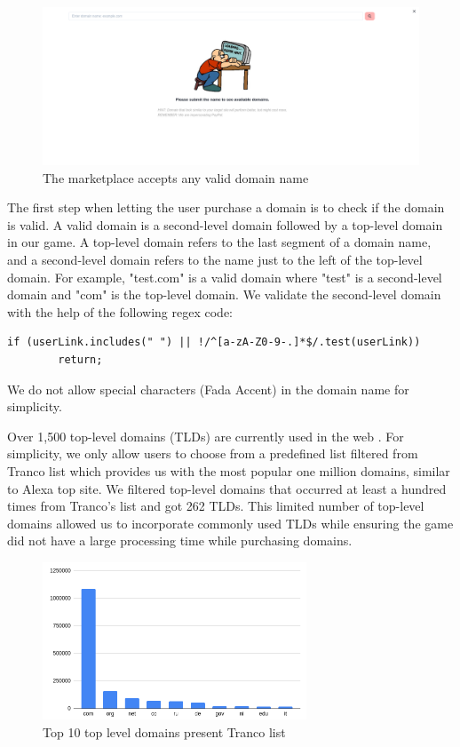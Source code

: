 \begin{figure}[!ht]
    \centering
    \includegraphics[width=1\textwidth]{figures/section2/marketplace_empty.png}
    \caption[Screenshot of marketplace]{The marketplace accepts any valid domain name}
    \label{fig:marketplace}
\end{figure}

The first step when letting the user purchase a domain is to check if the domain is valid. A valid domain is a second-level domain followed by a top-level domain in our game. A top-level domain refers to the last segment of a domain name, and a second-level domain refers to the name just to the left of the top-level domain. For example, "test.com" is a valid domain where "test" is a second-level domain and "com" is the top-level domain. We validate the second-level domain with the help of the following regex code:

\hfill
\begin{lstlisting}[basicstyle=\small]
    if (userLink.includes(" ") || !/^[a-zA-Z0-9-.]*$/.test(userLink))
        return;
\end{lstlisting}

We do not allow special characters (Fada Accent) in the domain name for simplicity.

Over 1,500 top-level domains (TLDs) are currently used in the web  \cite{tld}. For simplicity, we only allow users to choose from a predefined list filtered from Tranco list \cite{trancos} which provides us with the most popular one million domains, similar to Alexa top site. We filtered top-level domains that occurred at least a hundred times from Tranco's list and got 262 TLDs. This limited number of top-level domains allowed us to incorporate commonly used TLDs while ensuring the game did not have a large processing time while purchasing domains.

\begin{figure}[h]
    \centering
    \includegraphics[width=0.7\textwidth]{figures/section2/tld.png}
    \caption{Top 10 top level domains present Tranco list}
    \label{fig:marketplace_tld}
\end{figure}


